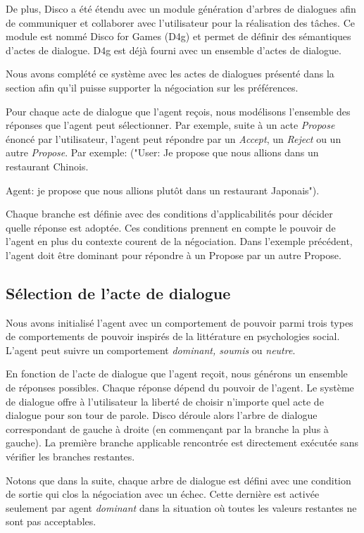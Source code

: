 	De plus, Disco a été étendu avec un module génération d'arbres de dialogues afin de communiquer et collaborer avec l'utilisateur pour la réalisation des tâches. Ce module est nommé Disco for Games (D4g) et permet de définir des sémantiques d'actes de dialogue. D4g est déjà fourni avec un ensemble d'actes de dialogue.
	
	Nous avons complété ce système avec les actes de dialogues présenté dans la section \label{sec:communication} afin qu'il puisse supporter la négociation sur les préférences.
	
	Pour chaque acte de dialogue que l'agent reçois, nous modélisons l'ensemble des réponses que l'agent peut sélectionner. Par exemple, suite à un acte \emph{Propose} énoncé par l'utilisateur, l'agent peut répondre par un \emph{Accept}, un \emph{Reject} ou un autre \emph{Propose}. Par exemple:
	 ("User: Je propose que nous allions dans un restaurant Chinois. 
		 
			Agent: je propose que nous allions plutôt dans un restaurant Japonais"). 
	
	Chaque branche est définie avec des conditions d'applicabilités pour décider quelle réponse est adoptée. 
	Ces conditions prennent en compte le pouvoir de l'agent en plus du contexte courent de la négociation. Dans l'exemple précédent, l'agent doit être dominant pour répondre à un Propose par un autre Propose. 
	
	
	\subsection{Sélection de l'acte de dialogue}
		Nous avons initialisé l'agent avec un comportement de pouvoir parmi trois types de comportements de pouvoir inspirés de la littérature en psychologies social.  L'agent peut suivre un comportement \emph{dominant, soumis} ou \emph{neutre}. 
		
		En fonction de l'acte de dialogue que l'agent reçoit, nous générons un ensemble de réponses possibles. Chaque réponse dépend du pouvoir de l'agent. Le système de dialogue offre à l'utilisateur la liberté de choisir n'importe quel acte de dialogue pour son tour de parole. Disco déroule alors l'arbre de dialogue correspondant de gauche à droite (en commençant par la branche la plus à gauche). La première branche applicable rencontrée est directement exécutée sans vérifier les branches restantes.
		
		Notons que dans la suite, chaque arbre de dialogue est défini avec une condition de sortie qui clos la négociation avec un échec. Cette dernière est activée seulement par agent \emph{dominant} dans la situation où toutes les valeurs restantes ne sont pas acceptables. 
		
